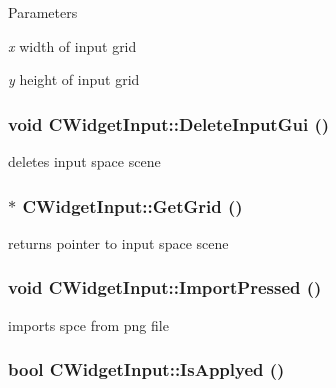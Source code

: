 \begin{DoxyParams}{Parameters}
\item[{\em x}]width of input grid \item[{\em y}]height of input grid \end{DoxyParams}
\hypertarget{classCWidgetInput_a5290e35eb931ebd4d6dd107d75bf6caf}{
\subsubsection[{DeleteInputGui}]{\setlength{\rightskip}{0pt plus 5cm}void CWidgetInput::DeleteInputGui ()}}
\label{classCWidgetInput_a5290e35eb931ebd4d6dd107d75bf6caf}
deletes input space scene \hypertarget{classCWidgetInput_aa4ed42952441c02ef7c852611e470bf6}{
\subsubsection[{GetGrid}]{ $\ast$ CWidgetInput::GetGrid ()}}
\label{classCWidgetInput_aa4ed42952441c02ef7c852611e470bf6}
returns pointer to input space scene \hypertarget{classCWidgetInput_a5112cafe4e68baf7952ddfa2b055ca5c}{
\subsubsection[{ImportPressed}]{\setlength{\rightskip}{0pt plus 5cm}void CWidgetInput::ImportPressed ()}}
\label{classCWidgetInput_a5112cafe4e68baf7952ddfa2b055ca5c}
imports spce from png file \hypertarget{classCWidgetInput_abb4665c76fc6fa6596672492d2692fa5}{
\subsubsection[{IsApplyed}]{\setlength{\rightskip}{0pt plus 5cm}bool CWidgetInput::IsApplyed ()}}
\label{classCWidgetInput_abb4665c76fc6fa6596672492d2692fa5}
